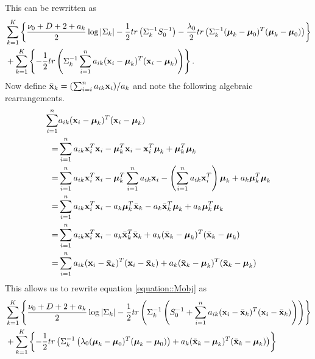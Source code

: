 \documentclass[12pt,english]{article}\usepackage[]{graphicx}\usepackage[]{color}
\begin{document}
This can be rewritten as
\begin{equation}\label{equation::Mobj}
\begin{split}
&\sum_{k=1}^{K} \left\{\frac{\nu_0 + D + 2 + a_k }{2} \log|\Sigma_k|  - \frac{1}{2} tr \left(\Sigma_{k}^{-1} S_0^{-1}\right) - \frac{\lambda_0}{2} tr \left( \Sigma_{k}^{-1}(\boldsymbol{\mu}_k - \boldsymbol{\mu}_0)^T(\boldsymbol{\mu}_k - \boldsymbol{\mu}_0) \right)\right\} \\
& + \sum_{k=1}^{K} \left\{- \frac{1}{2} tr\left(\Sigma_{k}^{-1}\sum_{i=1}^{n}a_{ik}({\bf x}_i - \boldsymbol{\mu}_k)^{T}({\bf x}_i - \boldsymbol{\mu}_k)\right) \right\}.
\end{split}
\end{equation}
Now define $\bar{{\bf x}}_k = (\sum_{i=i}^{n}a_{ik}{\bf x}_i)/a_k$ and note the following algebraic rearrangements.
\begin{equation}
\begin{split}
\sum_{i=1}^{n} &a_{ik}({\bf x}_i - \boldsymbol{\mu}_k)^{T}({\bf x}_i - \boldsymbol{\mu}_k)\\
 = & \sum_{i=1}^{n} a_{ik}{\bf x}_i^{T}{\bf x}_i - \boldsymbol{\mu}_k^{T}{\bf x}_i -  {\bf x}_i^{T}\boldsymbol{\mu}_k + \boldsymbol{\mu}_k^{T}\boldsymbol{\mu}_k\\
 = & \sum_{i=1}^{n} a_{ik}{\bf x}_i^{T}{\bf x}_i - \boldsymbol{\mu}_k^{T} \sum_{i=1}^{n} a_{ik}{\bf x}_i -  \left(\sum_{i=1}^{n} a_{ik}{\bf x}_i^{T}\right)\boldsymbol{\mu}_k + a_k\boldsymbol{\mu}_k^{T}\boldsymbol{\mu}_k\\
  = & \sum_{i=1}^{n} a_{ik}{\bf x}_i^{T}{\bf x}_i - a_k\boldsymbol{\mu}_k^{T}\bar{{\bf x}}_k -  a_k \bar{{\bf x}}_k^{T}\boldsymbol{\mu}_k + a_k\boldsymbol{\mu}_k^{T}\boldsymbol{\mu}_k\\
  = & \sum_{i=1}^{n} a_{ik}{\bf x}_i^{T}{\bf x}_i - a_k\bar{{\bf x}}_k^{T}\bar{{\bf x}}_k + a_k(\bar{{\bf x}}_k - \boldsymbol{\mu}_k)^{T} (\bar{{\bf x}}_k - \boldsymbol{\mu}_k)\\
  = & \sum_{i=1}^{n} a_{ik}({\bf x}_i -\bar{{\bf x}}_k)^{T}({\bf x}_i -\bar{{\bf x}}_k) + a_k(\bar{{\bf x}}_k - \boldsymbol{\mu}_k)^{T} (\bar{{\bf x}}_k - \boldsymbol{\mu}_k)\\
\end{split}
\end{equation}
This allows us to rewrite equation \ref{equation::Mobj} as
\begin{equation}\label{equation::Mobj2}
\begin{split}
&\sum_{k=1}^{K} \left\{\frac{\nu_0 + D + 2 + a_k }{2} \log|\Sigma_k|  - \frac{1}{2} tr \left(\Sigma_{k}^{-1} \left(S_0^{-1}+ \sum_{i=1}^{n} a_{ik}({\bf x}_i -\bar{{\bf x}}_k)^{T}({\bf x}_i -\bar{{\bf x}}_k) \right)\right)\right\}\\
& +  \sum_{k=1}^{K}\left\{-\frac{1}{2} tr \left( \Sigma_{k}^{-1}\left(\lambda_0(\boldsymbol{\mu}_k - \boldsymbol{\mu}_0)^T(\boldsymbol{\mu}_k - \boldsymbol{\mu}_0)\right) + a_k(\bar{{\bf x}}_k - \boldsymbol{\mu}_k)^{T} (\bar{{\bf x}}_k - \boldsymbol{\mu}_k)\right)\right\} \\
\end{split}
\end{equation}
\end{document}

